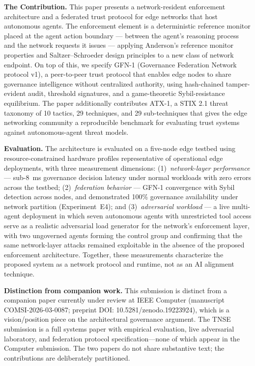 \documentclass[11pt]{letter}
\begin{document}
\begin{letter}
\textbf{The Contribution.} This paper presents a network-resident enforcement architecture and a federated trust protocol for edge networks that host autonomous agents. The enforcement element is a deterministic reference monitor placed at the agent action boundary --- between the agent's reasoning process and the network requests it issues --- applying Anderson's reference monitor properties and Saltzer--Schroeder design principles to a new class of network endpoint. On top of this, we specify GFN-1 (Governance Federation Network protocol v1), a peer-to-peer trust protocol that enables edge nodes to share governance intelligence without centralized authority, using hash-chained tamper-evident audit, threshold signatures, and a game-theoretic Sybil-resistance equilibrium. The paper additionally contributes ATX-1, a STIX 2.1 threat taxonomy of 10 tactics, 29 techniques, and 29 sub-techniques that gives the edge networking community a reproducible benchmark for evaluating trust systems against autonomous-agent threat models.

\textbf{Evaluation.} The architecture is evaluated on a five-node edge testbed using resource-constrained hardware profiles representative of operational edge deployments, with three measurement dimensions: (1)~\emph{network-layer performance} --- sub-8~ms governance decision latency under normal workloads with zero errors across the testbed; (2)~\emph{federation behavior} --- GFN-1 convergence with Sybil detection across nodes, and demonstrated 100\% governance availability under network partition (Experiment~E4); and (3)~\emph{adversarial workload} --- a live multi-agent deployment in which seven autonomous agents with unrestricted tool access serve as a realistic adversarial load generator for the network's enforcement layer, with two ungoverned agents forming the control group and confirming that the same network-layer attacks remained exploitable in the absence of the proposed enforcement architecture. Together, these measurements characterize the proposed system as a network protocol and runtime, not as an AI alignment technique.

\textbf{Distinction from companion work.} This submission is distinct from a companion paper currently under review at IEEE Computer (manuscript COMSI-2026-03-0087; preprint DOI: 10.5281/zenodo.19223924), which is a vision/position piece on the architectural governance argument. The TNSE submission is a full systems paper with empirical evaluation, live adversarial laboratory, and federation protocol specification---none of which appear in the Computer submission. The two papers do not share substantive text; the contributions are deliberately partitioned.


\end{letter}
\end{document}

